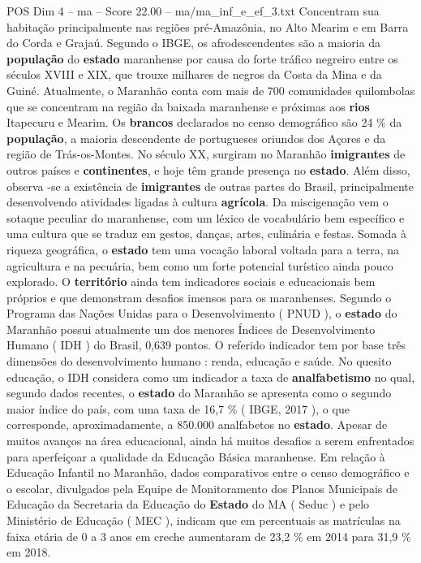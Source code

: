 \begin{textsample}{POS Dim 4 – ma – Score 22.00 – ma/ma\_inf\_e\_ef\_3.txt}
Concentram sua habitação principalmente nas regiões pré-Amazônia, no Alto Mearim e em Barra do Corda e Grajaú.
Segundo o IBGE, os afrodescendentes são a maioria da \textbf{população} do \textbf{estado} maranhense por causa do forte tráfico negreiro entre os séculos XVIII e XIX, que trouxe milhares de negros da Costa da Mina e da Guiné.
Atualmente, o Maranhão conta com mais de 700 comunidades quilombolas que se concentram na região da baixada maranhense e próximas aos \textbf{rios} Itapecuru e Mearim.
Os \textbf{brancos} declarados no censo demográfico são 24 \% da \textbf{população}, a maioria descendente de portugueses oriundos dos Açores e da região de Trás-os-Montes.
No século XX, surgiram no Maranhão \textbf{imigrantes} de outros países e \textbf{continentes}, e hoje têm grande presença no \textbf{estado}.
Além disso, observa -se a existência de \textbf{imigrantes} de outras partes do Brasil, principalmente desenvolvendo atividades ligadas à cultura \textbf{agrícola}.
Da miscigenação vem o sotaque peculiar do maranhense, com um léxico de vocabulário bem específico e uma cultura que se traduz em gestos, danças, artes, culinária e festas.
Somada à riqueza geográfica, o \textbf{estado} tem uma vocação laboral voltada para a terra, na agricultura e na pecuária, bem como um forte potencial turístico ainda pouco explorado.
O \textbf{território} ainda tem indicadores sociais e educacionais bem próprios e que demonstram desafios imensos para os maranhenses.
Segundo o Programa das Nações Unidas para o Desenvolvimento ( PNUD ), o \textbf{estado} do Maranhão possui atualmente um dos menores Índices de Desenvolvimento Humano ( IDH ) do Brasil, 0,639 pontos.
O referido indicador tem por base três dimensões do desenvolvimento humano : renda, educação e saúde.
No quesito educação, o IDH considera como um indicador a taxa de \textbf{analfabetismo} no qual, segundo dados recentes, o \textbf{estado} do Maranhão se apresenta como o segundo maior índice do país, com uma taxa de 16,7 \% ( IBGE, 2017 ), o que corresponde, aproximadamente, a 850.000 analfabetos no \textbf{estado}.
Apesar de muitos avanços na área educacional, ainda há muitos desafios a serem enfrentados para aperfeiçoar a qualidade da Educação Básica maranhense.
Em relação à Educação Infantil no Maranhão, dados comparativos entre o censo demográfico e o escolar, divulgados pela Equipe de Monitoramento dos Planos Municipais de Educação da Secretaria da Educação do \textbf{Estado} do MA ( Seduc ) e pelo Ministério de Educação ( MEC ), indicam que em percentuais as matrículas na faixa etária de 0 a 3 anos em creche aumentaram de 23,2 \% em 2014 para 31,9 \% em 2018.

\end{textsample}
